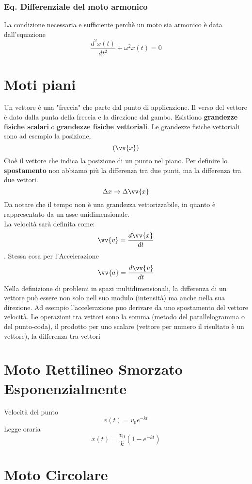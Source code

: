 \documentclass[a4paper]{report}
\begin{document}
  \subsubsection{Eq. Differenziale del moto armonico}
  La condizione necessaria e sufficiente perchè un moto sia armonico è data dall'equazione
  $$ \frac{d^2 x(t)}{dt^2} + \omega^2 x(t) = 0 $$

  \section{Moti piani}
  Un vettore è una "freccia" che parte dal punto di applicazione. Il verso del vettore è dato dalla punta della freccia e la direzione dal gambo.
  Esistiono \textbf{grandezze fisiche scalari} o \textbf{grandezze fisiche vettoriali}.
  Le grandezze fisiche vettoriali sono ad esempio la posizione,
  $$ (\vv{x})$$
  Cioè il vettore che indica la posizione di un punto nel piano.
  Per definire lo \textbf{spostamento} non abbiamo più la differenza tra due punti, ma la differenza tra due vettori.
  $$\Delta x \rightarrow \Delta \vv{x}$$
  Da notare che il tempo non è una grandezza vettorizzabile, in quanto è rappresentato da un asse unidimensionale.\\
  La velocità sarà definita come:
  $$\vv{v} = \frac{d\vv{x}}{dt}$$.
  Stessa cosa per l'Accelerazione
  $$\vv{a} = \frac{d\vv{v}}{dt}$$
  Nella definizione di problemi in spazi multidimensionali, la differenza di un vettore può essere non solo nell suo modulo (intensità) ma anche nella sua direzione. Ad esempio l'accelerazione puo derivare da uno spostamento del vettore velocità.
  Le operazioni tra vettori sono la somma (metodo del parallelogramma o del punto-coda), il prodotto per uno scalare (vettore per numero il risultato è un vettore), la differenza tra vettori


  \section{Moto Rettilineo Smorzato Esponenzialmente}
  Velocità del punto
  $$ v(t) = v_0 e^{-kt} $$
  Legge oraria
  $$ x(t) = \frac{v_0}{k} (1-e^{-kt}) $$


  \section{Moto Circolare}
\end{document}
